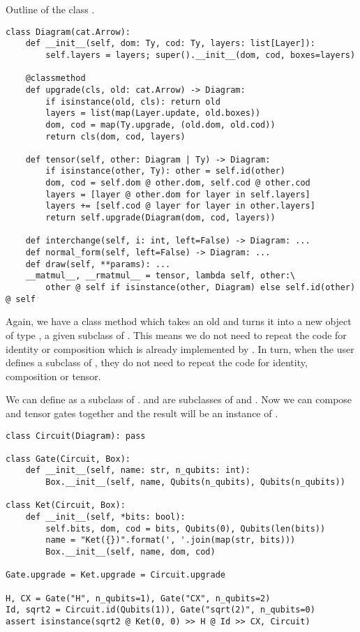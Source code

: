 \begin{python}
{\normalfont Outline of the class .}
\begin{verbatim}
class Diagram(cat.Arrow):
    def __init__(self, dom: Ty, cod: Ty, layers: list[Layer]):
        self.layers = layers; super().__init__(dom, cod, boxes=layers)

    @classmethod
    def upgrade(cls, old: cat.Arrow) -> Diagram:
        if isinstance(old, cls): return old
        layers = list(map(Layer.update, old.boxes))
        dom, cod = map(Ty.upgrade, (old.dom, old.cod))
        return cls(dom, cod, layers)

    def tensor(self, other: Diagram | Ty) -> Diagram:
        if isinstance(other, Ty): other = self.id(other)
        dom, cod = self.dom @ other.dom, self.cod @ other.cod
        layers = [layer @ other.dom for layer in self.layers]
        layers += [self.cod @ layer for layer in other.layers]
        return self.upgrade(Diagram(dom, cod, layers))

    def interchange(self, i: int, left=False) -> Diagram: ...
    def normal_form(self, left=False) -> Diagram: ...
    def draw(self, **params): ...
    __matmul__, __rmatmul__ = tensor, lambda self, other:\
        other @ self if isinstance(other, Diagram) else self.id(other) @ self
\end{verbatim}
\end{python}

Again, we have a class method  which takes an old  and turns it into a new object of type , a given subclass of .
This means we do not need to repeat the code for identity or composition which is already implemented by \py{cat.Arrow}.
In turn, when the user defines a subclass of \py{Diagram}, they do not need to repeat the code for identity, composition or tensor.

\begin{example}
We can define  as a subclass of .  and  are subclasses of  and .
Now we can compose and tensor gates together and the result will be an instance of \py{Circuit}.

\begin{verbatim}
class Circuit(Diagram): pass

class Gate(Circuit, Box):
    def __init__(self, name: str, n_qubits: int):
        Box.__init__(self, name, Qubits(n_qubits), Qubits(n_qubits))

class Ket(Circuit, Box):
    def __init__(self, *bits: bool):
        self.bits, dom, cod = bits, Qubits(0), Qubits(len(bits))
        name = "Ket({})".format(', '.join(map(str, bits)))
        Box.__init__(self, name, dom, cod)

Gate.upgrade = Ket.upgrade = Circuit.upgrade

H, CX = Gate("H", n_qubits=1), Gate("CX", n_qubits=2)
Id, sqrt2 = Circuit.id(Qubits(1)), Gate("sqrt(2)", n_qubits=0)
assert isinstance(sqrt2 @ Ket(0, 0) >> H @ Id >> CX, Circuit)
\end{verbatim}
\end{example}

